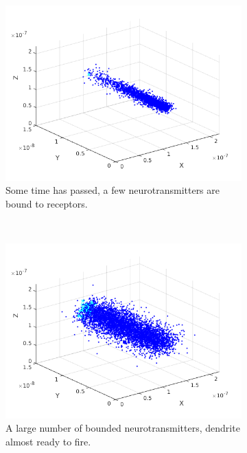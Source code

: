\begin{figure}[ht]
        \centering
        \begin{subfigure}[b]{0.45 \textwidth}
                \includegraphics[width=\textwidth]{sim01}
                \caption{Some time has passed, a few neurotransmitters are bound to receptors.}
        \end{subfigure}
        ~
        \begin{subfigure}[b]{0.45 \textwidth}
                \includegraphics[width=\textwidth]{sim02}
                \caption{A large number of bounded neurotransmitters, dendrite almost ready to fire.}
        \end{subfigure}
        \\
        \begin{subfigure}[b]{0.45 \textwidth}

\end{subfigure}
\end{figure}
